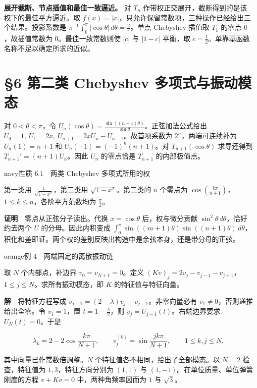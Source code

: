 \documentclass[11pt,a4paper]{article}
\newcommand{\lectureheading}[1]{\section{#1}}
\begin{document}
\textbf{展开截断、节点插值和最佳一致逼近。} 对 \(T_n\) 作带权正交展开，截断得到的是该权下的最佳平方逼近。取 \(f(x)=|x|\)，只允许保留常数项，三种操作已经给出三个结果。投影系数是 \(\pi^{-1}\int_0^\pi|\cos\theta|\,d\theta=\frac{2}{\pi}\)。单点 Chebyshev 插值取 \(T_1\) 的零点 \(0\)，故插值常数为 \(0\)。最佳一致常数则使 \(|c|\) 与 \(|1-c|\) 平衡，取 \(c=\frac{1}{2}\)。单靠基函数名称不足以确定所求的近似。

\clearpage\lectureheading{§6 第二类 Chebyshev 多项式与振动模态}

对 \(0<\theta<\pi\)，令 \(U_n(\cos\theta)=\frac{\sin((n+1)\theta)}{\sin\theta}\)。正弦加法公式给出 \(U_0=1,\ U_1=2x,\ U_{n+1}=2xU_n-U_{n-1}\)。故首项系数为 \(2^n\)，两端可连续补为 \(U_n(1)=n+1\) 和 \(U_n(-1)=(-1)^n(n+1)\)。对 \(T_{n+1}(\cos\theta)\) 求导还得到 \(T_{n+1}'=(n+1)U_n\)。因此 \(U_n\) 的零点恰是 \(T_{n+1}\) 的内部极值点。

\begin{sboxenv}{navy}{性质 6.1　两类 Chebyshev 多项式所用的权}

第一类用 \(\frac{1}{\sqrt{1-x^2}}\)，第二类用 \(\sqrt{1-x^2}\)。第二类的 \(n\) 个零点为 \(\cos(\frac{k\pi}{n+1})\)，\(1\le k\le n\)，各阶平方范数均为 \(\frac{\pi}{2}\)。

\end{sboxenv}

\textbf{证明}　零点从正弦分子读出。代换 \(x=\cos\theta\) 后，权与微分贡献 \(\sin^2\theta\,d\theta\)，恰好约去两个 \(U\) 的分母。因此内积变成 \(\int_0^\pi\sin((m+1)\theta)\sin((n+1)\theta)\,d\theta\)，积化和差即证。两个权的差别反映出构造中是余弦本身，还是带分母的正弦。

\begin{sboxenv}{orange}{例 4　两端固定的离散振动链}

取 \(N\) 个内部点，补边界 \(v_0=v_{N+1}=0\)。定义 \((Kv)_j=2v_j-v_{j-1}-v_{j+1}\)，\(1\le j\le N\)。求所有振动模态，即 \(K\) 的特征值与特征向量。

\end{sboxenv}

\textbf{解}　将特征方程写成 \(v_{j+1}=(2-\lambda)v_j-v_{j-1}\)。非零向量必有 \(v_1\ne0\)，否则递推给出全零。令 \(v_1=1\)，置 \(t=1-\frac{\lambda}{2}\)，则 \(v_j=U_{j-1}(t)\)。右端边界要求 \(U_N(t)=0\)。于是

\[
\lambda_k=2-2\cos\frac{k\pi}{N+1},\qquad
v_j^{(k)}=\sin\frac{jk\pi}{N+1},\qquad 1\le k,j\le N ,
\]

其中向量已作常数倍调整。\(N\) 个特征值各不相同，给出了全部模态。以 \(N=2\) 检查，特征值为 \(1,3\)，特征方向分别为 \((1,1)\) 与 \((1,-1)\)。在单位质量、单位弹簧刚度的方程 \(\ddot v+Kv=0\) 中，两种角频率因而为 \(1\) 与 \(\sqrt3\)。
\end{document}
